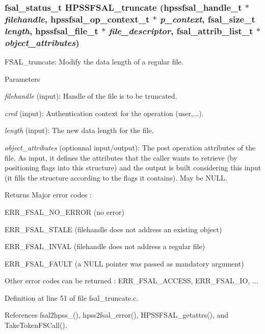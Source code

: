 \subsubsection[{HPSSFSAL\_\-truncate}]{\setlength{\rightskip}{0pt plus 5cm}fsal\_\-status\_\-t HPSSFSAL\_\-truncate (hpssfsal\_\-handle\_\-t $\ast$ {\em filehandle}, \/  hpssfsal\_\-op\_\-context\_\-t $\ast$ {\em p\_\-context}, \/  fsal\_\-size\_\-t {\em length}, \/  hpssfsal\_\-file\_\-t $\ast$ {\em file\_\-descriptor}, \/  fsal\_\-attrib\_\-list\_\-t $\ast$ {\em object\_\-attributes})}\label{fsal__truncate_8c_aef0c66ea970ac68153cdc96a0ef39706}
FSAL\_\-truncate: Modify the data length of a regular file.


\begin{DoxyParams}{Parameters}
\item[{\em filehandle}](input): Handle of the file is to be truncated. \item[{\em cred}](input): Authentication context for the operation (user,...). \item[{\em length}](input): The new data length for the file. \item[{\em object\_\-attributes}](optionnal input/output): The post operation attributes of the file. As input, it defines the attributes that the caller wants to retrieve (by positioning flags into this structure) and the output is built considering this input (it fills the structure according to the flags it contains). May be NULL.\end{DoxyParams}
\begin{DoxyReturn}{Returns}
Major error codes :
\begin{DoxyItemize}
\item ERR\_\-FSAL\_\-NO\_\-ERROR (no error)
\item ERR\_\-FSAL\_\-STALE (filehandle does not address an existing object)
\item ERR\_\-FSAL\_\-INVAL (filehandle does not address a regular file)
\item ERR\_\-FSAL\_\-FAULT (a NULL pointer was passed as mandatory argument)
\item Other error codes can be returned : ERR\_\-FSAL\_\-ACCESS, ERR\_\-FSAL\_\-IO, ... 
\end{DoxyItemize}
\end{DoxyReturn}


Definition at line 51 of file fsal\_\-truncate.c.

References fsal2hpss\_(), hpss2fsal\_\-error(), HPSSFSAL\_\-getattrs(), and TakeTokenFSCall().